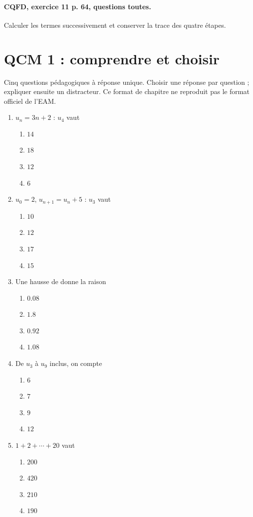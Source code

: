 \paragraph{CQFD, exercice 11 p. 64, questions toutes.}\label{C01-M2} Calculer les termes successivement et conserver la trace des quatre étapes.
\begingroup\small
\mxnewpage\section*{QCM 1 : comprendre et choisir}\label{C01-Q1}
Cinq questions pédagogiques à réponse unique. Choisir une réponse par question ; expliquer ensuite un distracteur. Ce format de chapitre ne reproduit pas le format officiel de l’EAM.
\begin{enumerate}
\item $u_n=3n+2$ : $u_4$ vaut
\begin{enumerate}[label=\Alph*.,itemsep=2pt]
\item $14$
\item $18$
\item $12$
\item $6$
\end{enumerate}
\item $u_0=2$, $u_{n+1}=u_n+5$ : $u_3$ vaut
\begin{enumerate}[label=\Alph*.,itemsep=2pt]
\item $10$
\item $12$
\item $17$
\item $15$
\end{enumerate}
\item Une hausse de  donne la raison
\begin{enumerate}[label=\Alph*.,itemsep=2pt]
\item $\num{0,08}$
\item $\num{1,8}$
\item $\num{0,92}$
\item $\num{1,08}$
\end{enumerate}
\item De $u_3$ à $u_9$ inclus, on compte
\begin{enumerate}[label=\Alph*.,itemsep=2pt]
\item $6$
\item $7$
\item $9$
\item $12$
\end{enumerate}
\item $1+2+\cdots+20$ vaut
\begin{enumerate}[label=\Alph*.,itemsep=2pt]
\item $200$
\item $420$
\item $210$
\item $190$
\end{enumerate}
\end{enumerate}

